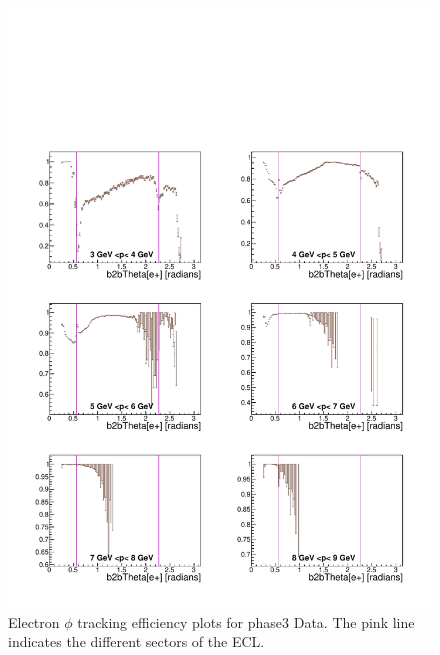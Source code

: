 \documentclass[a4paper,11pt,twosided,final,german,openbib,pdftex,listof=totoc,bibliography=totoc]{scrbook}
\begin{document}
\begin{appendix}
\begin{figure}[!htbp]
	\centering
	\includegraphics[width=\textwidth]{Plots/master3/xPMThetaem_DataP3}
	\caption[Momentum $\theta$ Electron Efficiency Phase3 Data]{Electron $\phi$ tracking efficiency plots for phase3 Data. The pink line indicates the different sectors of the ECL.}
	\label{plt:PMThetaem3_Data}
\end{figure}





\end{appendix}
\end{document}
